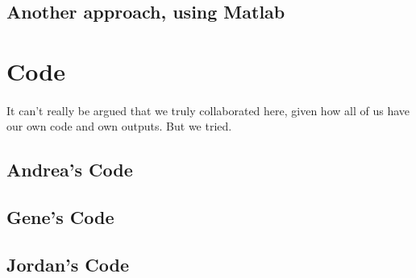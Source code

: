 \documentclass[12pt,a4paper]{article} %
\begin{document}
\newpage{}
\subsection{Another approach, using Matlab}

%


\section{Code}
\paragraph{}
It can't really be argued that we truly collaborated here, given how all of us have our own code and own outputs. But we tried.
\subsection{Andrea's Code}

\subsection{Gene's Code}

\subsection{Jordan's Code}

\end{document}
